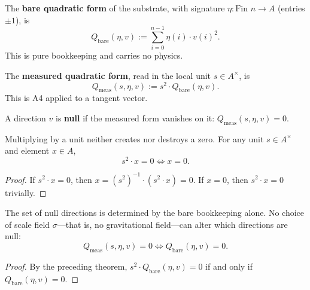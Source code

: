 \begin{definition}
The \textbf{bare quadratic form} of the substrate, with signature $\eta : \text{Fin } n \to A$ (entries $\pm 1$), is
\begin{equation}
Q_{\text{bare}}(\eta, v) := \sum_{i=0}^{n-1} \eta(i) \cdot v(i)^2 .
\end{equation}
This is pure bookkeeping and carries no physics.
\end{definition}

\begin{definition}
The \textbf{measured quadratic form}, read in the local unit $s \in A^\times$, is
\begin{equation}
Q_{\text{meas}}(s, \eta, v) := s^2 \cdot Q_{\text{bare}}(\eta, v) .
\end{equation}
This is A4 applied to a tangent vector.
\end{definition}

\begin{definition}
A direction $v$ is \textbf{null} if the measured form vanishes on it: $Q_{\text{meas}}(s, \eta, v) = 0$.
\end{definition}

\begin{theorem}
Multiplying by a unit neither creates nor destroys a zero. For any unit $s \in A^\times$ and element $x \in A$,
\begin{equation}
s^2 \cdot x = 0 \iff x = 0 .
\end{equation}
\end{theorem}

\begin{proof}
If $s^2 \cdot x = 0$, then $x = (s^2)^{-1} \cdot (s^2 \cdot x) = 0$. If $x = 0$, then $s^2 \cdot x = 0$ trivially.
\end{proof}

\begin{theorem}
The set of null directions is determined by the bare bookkeeping alone. No choice of scale field $\sigma$—that is, no gravitational field—can alter which directions are null:
\begin{equation}
Q_{\text{meas}}(s, \eta, v) = 0 \iff Q_{\text{bare}}(\eta, v) = 0 .
\end{equation}
\end{theorem}

\begin{proof}
By the preceding theorem, $s^2 \cdot Q_{\text{bare}}(\eta, v) = 0$ if and only if $Q_{\text{bare}}(\eta, v) = 0$.
\end{proof}

